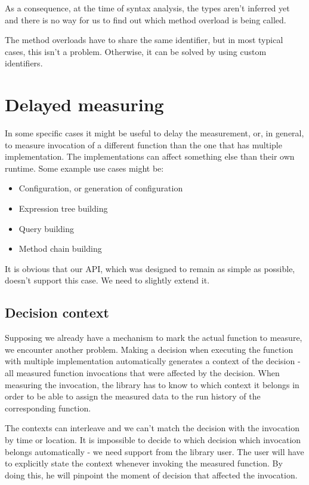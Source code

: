 As a consequence, at the time of syntax analysis, the types aren't inferred yet and there is no way for us to find out which method overload is being called.

The method overloads have to share the same identifier, but in most typical cases, this isn't a problem. Otherwise, it can be solved by using custom identifiers.
	
\section{Delayed measuring}

In some specific cases it might be useful to delay the measurement, or, in general, to measure invocation of a different function than the one that has multiple implementation. The implementations can affect something else than their own runtime. Some example use cases might be:

\begin{itemize}
	\item Configuration, or generation of configuration
	\item Expression tree building
	\item Query building
	\item Method chain building
\end{itemize}

It is obvious that our API, which was designed to remain as simple as possible, doesn't support this case. We need to slightly extend it.

\subsection{Decision context}

Supposing we already have a mechanism to mark the actual function to measure, we encounter another problem. Making a decision when executing the function with multiple implementation automatically generates a context of the decision - all measured function invocations that were affected by the decision. When measuring the invocation, the library has to know to which context it belongs in order to be able to assign the measured data to the run history of the corresponding function.

The contexts can interleave and we can't match the decision with the invocation by time or location. It is impossible to decide to which decision which invocation belongs automatically - we need support from the library user. The user will have to explicitly state the context whenever invoking the measured function. By doing this, he will pinpoint the moment of decision that affected the invocation.

